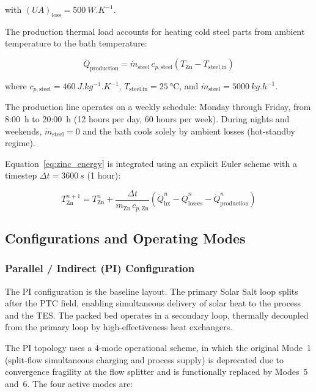 \documentclass[11pt,review,3p]{elsarticle}
\begin{document}
with $(UA)_{\text{loss}} = \SI{500}{W.K^{-1}}$.

The production thermal load accounts for heating cold steel parts from ambient temperature to the bath temperature:

\begin{equation}
    \dot{Q}_{\text{production}} = \dot{m}_{\text{steel}} \, c_{p,\text{steel}} \left(T_{\text{Zn}} - T_{\text{steel,in}}\right)
    \label{eq:zinc_prod}
\end{equation}

where $c_{p,\text{steel}} = \SI{460}{J.kg^{-1}.K^{-1}}$, $T_{\text{steel,in}} = \SI{25}{\celsius}$, and $\dot{m}_{\text{steel}} = \SI{5000}{kg.h^{-1}}$.

The production line operates on a weekly schedule: Monday through Friday, from \num{8:00}~h to \num{20:00}~h (12 hours per day, 60 hours per week). During nights and weekends, $\dot{m}_{\text{steel}} = 0$ and the bath cools solely by ambient losses (hot-standby regime).

Equation~\eqref{eq:zinc_energy} is integrated using an explicit Euler scheme with a timestep $\Delta t = \SI{3600}{s}$ (1 hour):

\begin{equation}
    T_{\text{Zn}}^{n+1} = T_{\text{Zn}}^{n} + \frac{\Delta t}{m_{\text{Zn}} \, c_{p,\text{Zn}}} \left( \dot{Q}_{\text{hx}}^{n} - \dot{Q}_{\text{losses}}^{n} - \dot{Q}_{\text{production}}^{n} \right)
    \label{eq:zinc_euler}
\end{equation}

\subsection{Configurations and Operating Modes}
\label{sec:modes}

\subsubsection{Parallel / Indirect (PI) Configuration}
\label{sec:pi_config}

The PI configuration is the baseline layout. The primary Solar Salt loop splits after the PTC field, enabling simultaneous delivery of solar heat to the process and the TES. The packed bed operates in a secondary loop, thermally decoupled from the primary loop by high-effectiveness heat exchangers.

The PI topology uses a 4-mode operational scheme, in which the original Mode~1 (split-flow simultaneous charging and process supply) is deprecated due to convergence fragility at the flow splitter and is functionally replaced by Modes~5 and~6. The four active modes are:
\end{document}
